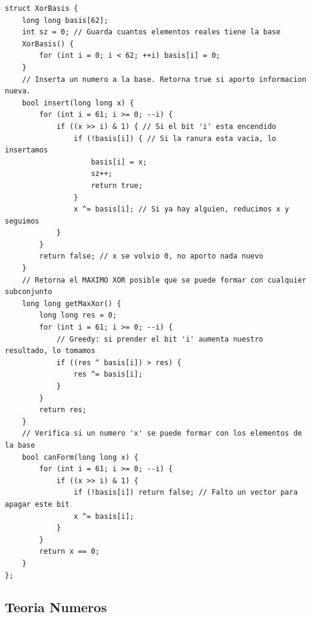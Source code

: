 \documentclass[10pt,landscape,twocolumn]{article}
\begin{document}
\begin{lstlisting}
struct XorBasis {
    long long basis[62];
    int sz = 0; // Guarda cuantos elementos reales tiene la base
    XorBasis() {
        for (int i = 0; i < 62; ++i) basis[i] = 0;
    }
    // Inserta un numero a la base. Retorna true si aporto informacion nueva.
    bool insert(long long x) {
        for (int i = 61; i >= 0; --i) {
            if ((x >> i) & 1) { // Si el bit 'i' esta encendido
                if (!basis[i]) { // Si la ranura esta vacia, lo insertamos
                    basis[i] = x;
                    sz++;
                    return true;
                }
                x ^= basis[i]; // Si ya hay alguien, reducimos x y seguimos
            }
        }
        return false; // x se volvio 0, no aporto nada nuevo
    }
    // Retorna el MAXIMO XOR posible que se puede formar con cualquier subconjunto
    long long getMaxXor() {
        long long res = 0;
        for (int i = 61; i >= 0; --i) {
            // Greedy: si prender el bit 'i' aumenta nuestro resultado, lo tomamos
            if ((res ^ basis[i]) > res) {
                res ^= basis[i];
            }
        }
        return res;
    }
    // Verifica si un numero 'x' se puede formar con los elementos de la base
    bool canForm(long long x) {
        for (int i = 61; i >= 0; --i) {
            if ((x >> i) & 1) {
                if (!basis[i]) return false; // Falto un vector para apagar este bit
                x ^= basis[i];
            }
        }
        return x == 0;
    }
};
\end{lstlisting}

\subsection{Teoria Numeros}
\end{document}
